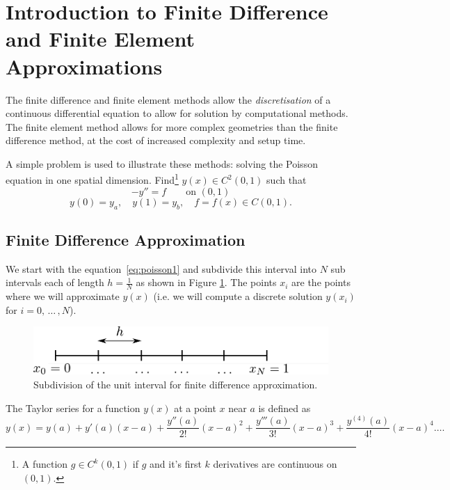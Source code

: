 \section{Introduction to Finite Difference and Finite Element Approximations}
\label{sec:intr-finite-ele-diff}

The finite difference and finite element methods allow the \emph{discretisation} of a continuous differential equation to allow for solution by computational methods. The finite element method allows for more complex geometries than the finite difference method, at the cost of increased complexity and setup time.

A simple problem is used to illustrate these methods: solving the Poisson
equation in one spatial dimension. Find\footnote{A function $g\in C^{k}(0,1)$ if $g$ and it's first $k$ derivatives are continuous on $(0,1)$.} $y(x)\in C^{2}(0,1)$ such that
\begin{equation}
  -y''=f\qquad\text{on }(0,1)
  \label{eq:poisson1}
\end{equation}
\begin{equation*}
  y(0)=y_{a},\quad y(1)=y_{b},\quad f=f(x)\in C(0,1).
\end{equation*}

\subsection{Finite Difference Approximation}
\label{sec:finite-diff-appr}

We start with the equation~\eqref{eq:poisson1} and subdivide this interval into
$N$ sub intervals each of length $h = \frac{1}{N}$ as shown in Figure
\ref{fig:The-subdivision}. The points $x_{i}$ are the points where we will
approximate $y(x)$ (i.e. we will compute a discrete solution $y(x_{i})$ for
$i=0, \, \ldots \, ,N$).

\begin{figure}[!ht]
  \center
  \includegraphics[width=1\textwidth]{./images/finite_diff_discretisation}
  \caption{Subdivision of the unit interval for finite difference approximation.}
  \label{fig:The-subdivision}
\end{figure}

The Taylor series for a function $y(x)$ at a point $x$ near $a$
is defined as
\begin{equation*}
  y(x)=y(a)+y'(a)(x-a)+\dfrac{y''(a)}{2!}(x-a)^{2}
  + \dfrac{y'''(a)}{3!}(x-a)^{3}+\dfrac{y^{(4)}(a)}{4!}(x-a)^{4}\ldots.
\end{equation*}

